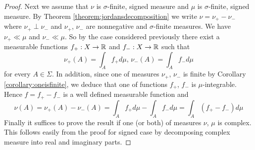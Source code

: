 \begin{proof}
Next we assume that $\nu$ is $\sigma$-finite, signed measure and $\mu$ is $\sigma$-finite, signed measure. By Theorem \ref{theorem:jordansdecomposition} we write $\nu = \nu_+ - \nu_-$ where $\nu_+ \perp \nu_-$ and $\nu_+$, $\nu_-$ are nonnegative and $\sigma$-finite measures. We have $\nu_+ \ll \mu$ and $\nu_- \ll \mu$. So by the case considered previously there exist a measurable functions $f_+:X\rightarrow {\mathbb R}$ and $f_-:X\rightarrow {\mathbb R}$ such that
$$\nu_+(A) = \int_A f_+d\mu,\,\nu_-(A) = \int_A f_-d\mu$$
for every $A\in \Sigma$. In addition, since one of measures $\nu_+$, $\nu_-$ is finite by Corollary \ref{corollary:oneisfinite}, we deduce that one of functions $f_+$, $f_-$ is $\mu$-integrable. Hence $f = f_+ - f_-$ is a well defined measurable function and
$$\nu(A) = \nu_+(A) - \nu_-(A) = \int_A f_+d\mu-\int_A f_-d\mu= \int_A(f_+-f_-)d\mu$$
Finally it suffices to prove the result if one (or both) of measures $\nu$, $\mu$ is complex. This follows easily from the proof for signed case by decomposing complex measure into real and imaginary parts.
\end{proof}

